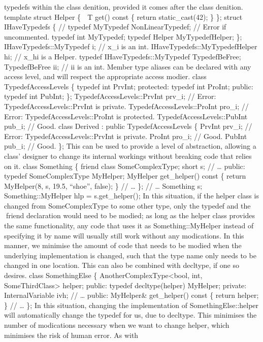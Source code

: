 typedefs within the class denition, provided it comes after the class
denition. template struct Helper \{  T get() const \{ return
static\_cast(42); \} \}; struct IHaveTypedefs \{ // typedef MyTypedef
NonLinearTypedef; // Error if uncommented. typedef int MyTypedef;
typedef Helper MyTypedefHelper; \}; IHaveTypedefs::MyTypedef i; // x\_i
is an int. IHaveTypedefs::MyTypedefHelper hi; // x\_hi is a Helper.
typedef IHaveTypedefs::MyTypedef TypedefBeFree; TypedefBeFree ii; // ii
is an int. Member type aliases can be declared with any access level,
and will respect the appropriate access modier. class
TypedefAccessLevels \{ typedef int PrvInt; protected: typedef int
ProInt; public: typedef int PubInt; \}; TypedefAccessLevels::PrvInt
prv\_i; // Error: TypedefAccessLevels::PrvInt is private.
TypedefAccessLevels::ProInt pro\_i; // Error:
TypedefAccessLevels::ProInt is protected. TypedefAccessLevels::PubInt
pub\_i; // Good. class Derived : public TypedefAccessLevels \{ PrvInt
prv\_i; // Error: TypedefAccessLevels::PrvInt is private. ProInt pro\_i;
// Good. PubInt pub\_i; // Good. \}; This can be used to provide a level
of abstraction, allowing a class' designer to change its internal
workings without breaking code that relies on it. class Something \{
friend class SomeComplexType; short s; // \ldots{} public: typedef
SomeComplexType MyHelper; MyHelper get\_helper() const \{ return
MyHelper(8, s, 19.5, ``shoe'', false); \} // \ldots{} \}; // \ldots{}
Something s; Something::MyHelper hlp = s.get\_helper(); In this
situation, if the helper class is changed from SomeComplexType to some
other type, only the typedef and the friend declaration would need to
be modied; as long as the helper class provides the same functionality,
any code that uses it as Something::MyHelper instead of specifying it by
name will usually still work without any modications. In this manner, we
minimise the amount of code that needs to be modied when the underlying
implementation is changed, such that the type name only needs to be
changed in one location. This can also be combined with decltype, if one
so desires. class SomethingElse \{ AnotherComplexType\textless bool,
int, SomeThirdClass\textgreater{} helper; public: typedef
decltype(helper) MyHelper; private: InternalVariable ivh; // \ldots{}
public: MyHelper\& get\_helper() const \{ return helper; \} // \ldots{}
\}; In this situation, changing the implementation of
SomethingElse::helper will automatically change the typedef for us, due
to decltype. This minimises the number of modications necessary when we
want to change helper, which minimises the risk of human error. As with
